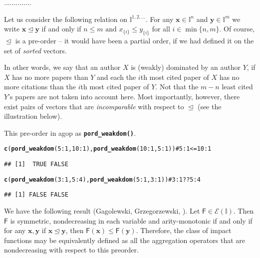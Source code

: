 \documentclass[11pt]{article}\usepackage{graphicx, color}
\makeatletter
\newcommand{\hlfunctioncall}[1]{\textcolor[rgb]{0.501960784313725,0,0.329411764705882}{\textbf{#1}}}%
\newcommand{\hlcomment}[1]{\textcolor[rgb]{0.180392156862745,0.6,0.341176470588235}{#1}}%
\newenvironment{kframe}{%
 \def\at@end@of@kframe{}%
 \ifinner\ifhmode%
  \def\at@end@of@kframe{\end{minipage}}%
  \begin{minipage}{\columnwidth}%
 \fi\fi%
 \def\FrameCommand##1{\hskip\@totalleftmargin \hskip-\fboxsep
 \colorbox{shadecolor}{##1}\hskip-\fboxsep
     \hskip-\linewidth \hskip-\@totalleftmargin \hskip\columnwidth}%
 \MakeFramed {\advance\hsize-\width
   \@totalleftmargin\z@ \linewidth\hsize
   \@setminipage}}%
 {\par\unskip\endMakeFramed%
 \at@end@of@kframe}
\newenvironment{knitrout}{}{} %
\newcommand{\package}[1]{\textsf{#1}\xspace}
\newcommand{\Rfunc}[1]{\texttt{\hlfunctioncall{#1}}}
\newcommand{\vect}[1]{{\mathbf{#1}}}
\newcommand{\func}[1]{{\mathsf{#1}}}
\newcommand{\Ival}{\mathbb{I}}
\newcommand{\IvalPow}[1]{\mathbb{I}^{#1}}
\newcommand{\AnyPow}{^{1,2,\dots}}
\newcommand{\IvalAnyPow}{\mathbb{I}\AnyPow}
\theoremstyle{remark}
\theoremstyle{definition}
\makeatother
\begin{document}
..............


Let us consider the following relation on $\IvalAnyPow$.
For any $\vect{x}\in\IvalPow{n}$ and $\vect{y}\in\IvalPow{m}$ we write
$\vect{x}\trianglelefteq\vect{y}$ if and only if
$n\le m\text{ and }x_{\{i\}}\le y_{\{i\}}$ for all $i\in\min\{n,m\}$.
Of course, $\trianglelefteq$ is a pre-order -- it
would have been a partial order, if we had defined it on the set
of \textit{sorted} vectors.



In other words, we  say that an author $X$
 is (weakly) dominated %
by an author $Y$, if $X$ has no more papers than $Y$ and each
the $i$th most cited paper of $X$ has no more citations than
the $i$th most cited paper of $Y$. Not that the $m-n$ least cited
$Y$'s papers are not taken into account here.
Most importantly, however,
there exist pairs of vectors
that are \textit{incomparable} with respect to $\trianglelefteq$ (see
the illustration below).

This pre-order in \package{agop} as \Rfunc{pord\_weakdom()}.

\begin{knitrout}\small
{}\color{fgcolor}\begin{kframe}
\begin{alltt}
\hlfunctioncall{c}(\hlfunctioncall{pord_weakdom}(5:1, 10:1), \hlfunctioncall{pord_weakdom}(10:1, 5:1)) \hlcomment{# 5:1 <= 10:1}
\end{alltt}
\begin{verbatim}
## [1]  TRUE FALSE
\end{verbatim}
\begin{alltt}
\hlfunctioncall{c}(\hlfunctioncall{pord_weakdom}(3:1, 5:4),  \hlfunctioncall{pord_weakdom}(5:1, 3:1))  \hlcomment{# 3:1 ?? 5:4}
\end{alltt}
\begin{verbatim}
## [1] FALSE FALSE
\end{verbatim}
\end{kframe}
\end{knitrout}


We have the following result
(Gagolewski, Grzegorzewski, \cite{GagolewskiGrzegorzewski2011:ijar}).
Let $\func{F}\in \mathcal{E}(\Ival)$. Then $\func{F}$
is symmetric, nondecreasing in each variable
and arity-monotonic if and only if for any $\vect{x},\vect{y}$
if $\vect{x}\trianglelefteq\vect{y}$, then
$\func{F}(\vect{x})\le \func{F}(\vect{y})$.
Therefore, the class of  impact functions may be equivalently
defined as all the aggregation operators
that are nondecreasing with respect to this preorder.
\end{document}
